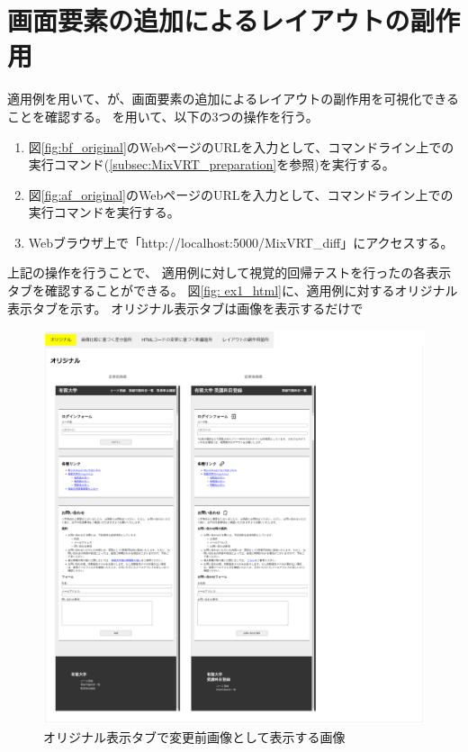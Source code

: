 \section{画面要素の追加によるレイアウトの副作用}\label{sec:result_area_detection}
適用例を用いて、\toolName が、画面要素の追加によるレイアウトの副作用を可視化できることを確認する。
\toolName を用いて、以下の3つの操作を行う。
\begin{enumerate}[label=操作\arabic*., leftmargin=1.8cm]
    \item 図\ref{fig:bf_original}のWebページのURLを入力として、コマンドライン上で\toolName の実行コマンド(\ref{subsec:MixVRT_preparation}を参照)を実行する。
    \item 図\ref{fig:af_original}のWebページのURLを入力として、コマンドライン上で\toolName の実行コマンドを実行する。
    \item Webブラウザ上で「http://localhost:5000/MixVRT\_diff」にアクセスする。
\end{enumerate}
\par
上記の操作を行うことで、
適用例に対して視覚的回帰テストを行った\toolName の各表示タブを確認することができる。
図\ref{fig: ex1_html}に、適用例に対するオリジナル表示タブを示す。
オリジナル表示タブは画像を表示するだけで
\begin{figure}[tp]
    \begin{center}
        \includegraphics[width=1.0\columnwidth]{image/5/original_png/original.png}
        \caption{オリジナル表示タブで変更前画像として表示する画像}
        \label{fig: bf_original}
    \end{center}
\end{figure}


